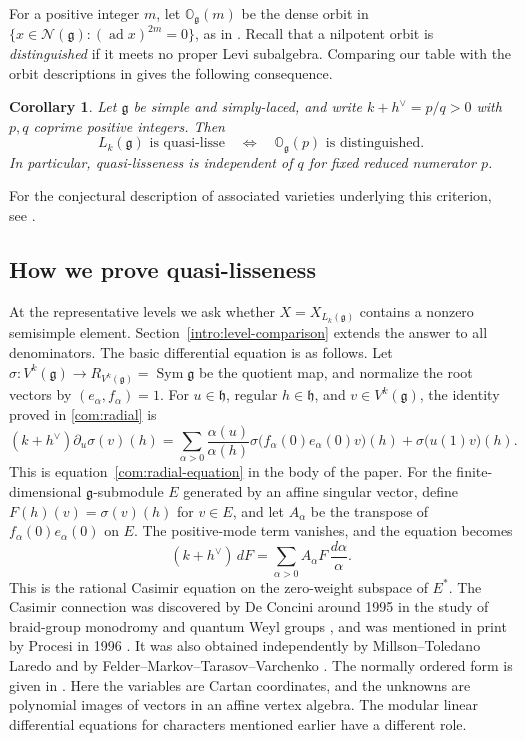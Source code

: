 \documentclass[11pt,a4paper]{amsart}
\numberwithin{equation}{section}
\newtheorem{corollary}[theorem]{Corollary}
\theoremstyle{definition}
\theoremstyle{remark}
\newcommand{\g}{\mathfrak g}
\newcommand{\h}{\mathfrak h}
\newcommand{\N}{\mathcal N}
\newcommand{\OO}{\mathbb O}
\newcommand{\ad}{\operatorname{ad}}
\newcommand{\Sym}{\operatorname{Sym}}
\begin{document}
For a positive integer $m$, let $\OO_{\g}(m)$ be the dense orbit in
$\{x\in\N(\g):(\ad x)^{2m}=0\}$, as in
\cite[Theorem~2.1.6]{ShanYanZhao2025}. Recall that a nilpotent orbit
is \emph{distinguished} if it meets no proper Levi subalgebra. Comparing our
table with the orbit descriptions in
\cite[Sections~2.1.9, 2.1.12 and 2.1.13]{ShanYanZhao2025}
gives the following consequence.
\begin{corollary}\label{cor:SYZ}
Let $\g$ be simple and simply-laced, and write
$k+h^\vee=p/q>0$ with $p,q$ coprime positive integers. Then
$$
 L_k(\g)\text{ is quasi-lisse}
 \quad\Longleftrightarrow\quad
 \OO_{\g}(p)\text{ is distinguished}.
$$
In particular, quasi-lisseness is independent of $q$ for fixed reduced
numerator $p$.
\end{corollary}
For the conjectural description of associated varieties underlying
this criterion, see \cite{ShanYanZhao2026}.

\subsection{How we prove quasi-lisseness}\label{sec:organization}
At the representative levels we ask whether $X=X_{L_k(\g)}$ contains
a nonzero semisimple element. Section~\ref{intro:level-comparison}
extends the answer to all denominators. The basic differential equation
is as follows. Let
$\sigma:V^k(\g)\to R_{V^k(\g)}=\Sym\g$ be the quotient map, and
normalize the root vectors by $(e_\alpha,f_\alpha)=1$.
For $u\in\h$, regular $h\in\h$, and $v\in V^k(\g)$, the identity
proved in \cref{com:radial} is
$$
 (k+h^\vee)\partial_u\sigma(v)(h)=
 \sum_{\alpha>0}\frac{\alpha(u)}{\alpha(h)}
       \sigma\bigl(f_\alpha(0)e_\alpha(0)v\bigr)(h)
       +\sigma\bigl(u(1)v\bigr)(h).
$$
This is equation~\eqref{com:radial-equation} in the body of the paper.
For the finite-dimensional $\g$-submodule $E$ generated by an affine
singular vector, define $F(h)(v)=\sigma(v)(h)$ for $v\in E$, and let
$A_\alpha$ be the transpose of $f_\alpha(0)e_\alpha(0)$ on $E$.
The positive-mode term vanishes, and the equation becomes
$$
 (k+h^\vee)\,dF=\sum_{\alpha>0}A_\alpha F\,\frac{d\alpha}{\alpha}.
$$
This is the rational Casimir equation on the zero-weight subspace of
$E^*$. The Casimir connection was discovered by De Concini around 1995
in the study of braid-group monodromy and quantum Weyl groups
\cite[Sections~1 and~5]{ToledanoLaredo2002}, and was mentioned in print
by Procesi in 1996 \cite{Procesi1996}. It was also obtained
independently by Millson--Toledano Laredo
\cite{MillsonToledanoLaredo2005} and by
Felder--Markov--Tarasov--Varchenko \cite{FMTV2000}. The normally
ordered form is given in \cite[Theorem~2.1]{FMTV2000}.
Here the variables are Cartan coordinates, and the unknowns are
polynomial images of vectors in an affine vertex algebra. The modular
linear differential equations for characters mentioned earlier have a
different role.
\end{document}
